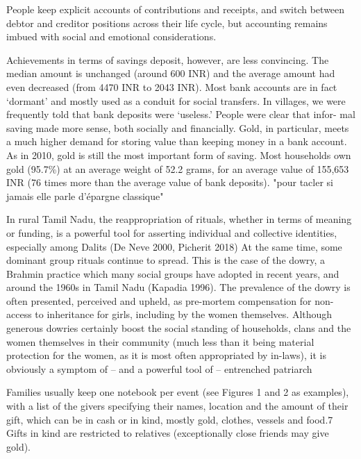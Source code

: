 \documentclass[a4paper, 11pt, onecolumn]{article}
\begin{document}
People keep explicit accounts of contributions and
receipts, and switch between debtor and creditor positions across their life cycle, but accounting
remains imbued with social and emotional considerations.

Achievements in terms of savings deposit,
however, are less convincing. The median amount is unchanged (around 600 INR) and the average
amount had even decreased (from 4470 INR to 2043 INR). Most bank accounts are in fact ‘dormant’
and mostly used as a conduit for social transfers. 
In villages, we were frequently told that bank deposits were ‘useless.’ People were clear that infor-
mal saving made more sense, both socially and financially. Gold, in particular, meets a much higher
demand for storing value than keeping money in a bank account. As in 2010, gold is still the most
important form of saving. Most households own gold (95.7\%) at an average weight of 52.2 grams, for
an average value of 155,653 INR (76 times more than the average value of bank deposits).
"pour tacler \cite{Anukriti2020} si jamais elle parle d'épargne classique"

 In rural Tamil Nadu, the reappropriation of rituals, whether in terms of meaning or funding, is a powerful
tool for asserting individual and collective identities, especially among Dalits (De Neve 2000, Picherit
2018) At the same time, some dominant group rituals continue to spread. This is the case of the
dowry, a Brahmin practice which many social groups have adopted in recent years, and around
the 1960s in Tamil Nadu (Kapadia 1996). The prevalence of the dowry is often presented, perceived
and upheld, as pre-mortem compensation for non-access to inheritance for girls, including by the
women themselves. Although generous dowries certainly boost the social standing of households,
clans and the women themselves in their community (much less than it being material protection
for the women, as it is most often appropriated by in-laws), it is obviously a symptom of – and a
powerful tool of – entrenched patriarch

Families usually keep one notebook per event (see Figures 1 and 2 as examples), with a list of the
givers specifying their names, location and the amount of their gift, which can be in cash or in
kind, mostly gold, clothes, vessels and food.7 Gifts in kind are restricted to relatives (exceptionally
close friends may give gold).
\end{document}
